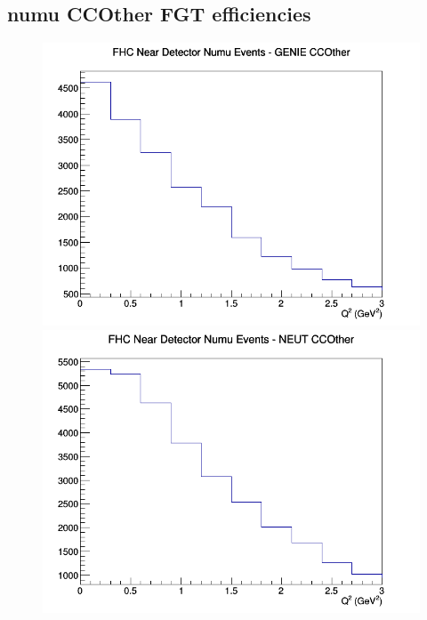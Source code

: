\subsection{numu CCOther FGT efficiencies}
\begin{figure}[h]
\includegraphics[width=\linewidth]{eff_Q2/FGT/CCOther_FHC_ND_numu_Q2_GENIE.png}
\endminipage
{}
\includegraphics[width=\linewidth]{eff_Q2/FGT/CCOther_FHC_ND_numu_Q2_NEUT.png}
\endminipage
{}

\end{figure}
